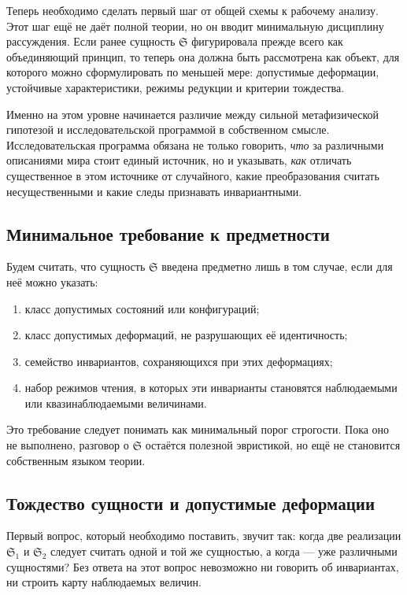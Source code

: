 \documentclass[12pt,a4paper]{article}
\begin{document}
Теперь необходимо сделать первый шаг от общей схемы к рабочему анализу. Этот шаг ещё не даёт полной теории, но он вводит минимальную дисциплину рассуждения. Если ранее сущность \(\mathfrak{S}\) фигурировала прежде всего как объединяющий принцип, то теперь она должна быть рассмотрена как объект, для которого можно сформулировать по меньшей мере: допустимые деформации, устойчивые характеристики, режимы редукции и критерии тождества.

Именно на этом уровне начинается различие между сильной метафизической гипотезой и исследовательской программой в собственном смысле. Исследовательская программа обязана не только говорить, \textit{что} за различными описаниями мира стоит единый источник, но и указывать, \textit{как} отличать существенное в этом источнике от случайного, какие преобразования считать несущественными и какие следы признавать инвариантными.

\subsection{Минимальное требование к предметности}

Будем считать, что сущность \(\mathfrak{S}\) введена предметно лишь в том случае, если для неё можно указать:
\begin{enumerate}
    \item класс допустимых состояний или конфигураций;
    \item класс допустимых деформаций, не разрушающих её идентичность;
    \item семейство инвариантов, сохраняющихся при этих деформациях;
    \item набор режимов чтения, в которых эти инварианты становятся наблюдаемыми или квазинаблюдаемыми величинами.
\end{enumerate}

Это требование следует понимать как минимальный порог строгости. Пока оно не выполнено, разговор о \(\mathfrak{S}\) остаётся полезной эвристикой, но ещё не становится собственным языком теории.

\subsection{Тождество сущности и допустимые деформации}

Первый вопрос, который необходимо поставить, звучит так: когда две реализации \(\mathfrak{S}_1\) и \(\mathfrak{S}_2\) следует считать одной и той же сущностью, а когда --- уже различными сущностями? Без ответа на этот вопрос невозможно ни говорить об инвариантах, ни строить карту наблюдаемых величин.
\end{document}

